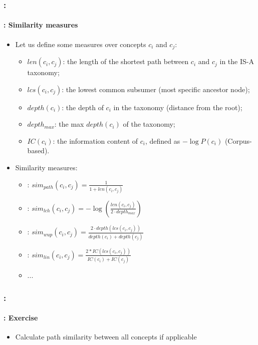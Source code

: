 \documentclass[xcolor=table]{beamer}
\begin{document}
\begin{frame}
	\frametitle{\insertshortsubtitle: \insertsection}
	\framesubtitle{\insertsubsection: Similarity measures}
	
	\begin{itemize}
		\item Let us define some measures over concepts $c_i$ and $c_j$:
		\begin{itemize}
			\item $len(c_i, c_j)$: the length of the shortest path between $c_i$ and $c_j$ in the IS-A taxonomy;
			\item $lcs(c_i, c_j)$: the lowest common subsumer (most specific ancestor node);
			\item $depth(c_i)$: the depth of $c_i$ in the taxonomy (distance from the root);
			\item $depth_{max}$: the max $depth(c_i)$ of the taxonomy;
			\item $IC(c_i)$: the information content of $c_i$, defined as $-\log P(c_i)$ (Corpus-based).
		\end{itemize}
		\item Similarity measures:
		\begin{itemize}
			\item {}: $sim_{path}(c_i, c_j) = \frac{1}{1+len(c_i, c_j)}$
			\item {}: $sim_{lch}(c_i, c_j) = -\log \left( \frac{len(c_i, c_j)}{2 \cdot depth_{max}} \right)$
			\item {}: $sim_{wup}(c_i, c_j) = \frac{2 \cdot depth(lcs(c_i, c_j))}{depth(c_i) + depth(c_j)}$
			\item {}: $sim_{lin}(c_i, c_j) = \frac{2*IC(lcs(c_i, c_j))}{IC(c_i)+IC(c_j)}$ 
			\item ...
		\end{itemize}
	\end{itemize}
	
\end{frame}

\begin{frame}
	\frametitle{\insertshortsubtitle: \insertsection}
	\framesubtitle{\insertsubsection: Exercise}
	
	
	\begin{itemize}
		\item Calculate path similarity between all concepts if applicable
	\end{itemize}
	
\end{frame}
\end{document}
